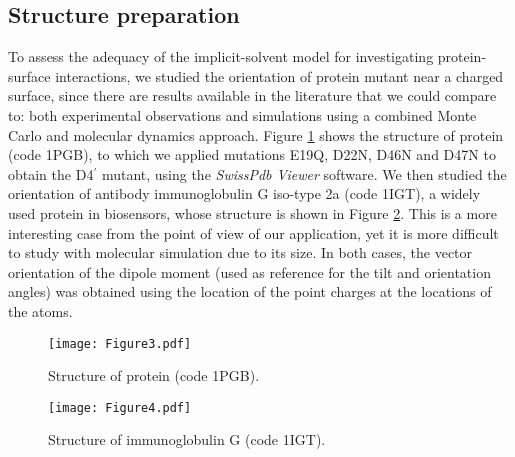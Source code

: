 \subsection{Structure preparation}

To assess the adequacy of the implicit-solvent model for investigating protein-surface interactions, we studied the orientation of protein \gb mutant near a charged surface, since there are results available in the literature that we could compare to: both experimental observations \cite{BaioWeidnerBaughGambleStaytonCastner2012} and simulations using a combined Monte Carlo and molecular dynamics approach.\cite{LiuLiaoZhou2013} Figure \ref{fig:1pgb} shows the structure of protein \gb (\pdb code {\small 1PGB}), to which we applied mutations {\small E19Q}, {\small D22N}, {\small D46N} and {\small D47N} to obtain the {\small D4$^\prime$} mutant, using the \textsl{SwissPdb Viewer} software.\cite{GuexPeitsch1997}
We then studied the orientation of antibody immunoglobulin G iso-type \ig 2a (\pdb code {\small 1IGT}), a widely used protein in biosensors, whose structure is shown in Figure \ref{fig:1igt}. This is a more interesting case from the point of view of our application, yet it is more difficult to study with molecular simulation due to its size.
In both cases, the vector orientation of the dipole moment (used as reference for the tilt and orientation angles) was obtained using the location of the point charges at the locations of the atoms.

\begin{figure}%
   \centering
   \texttt{[image: Figure3.pdf]}
   \caption{Structure of protein \gb (\pdb code {\small 1PGB}).}
   \label{fig:1pgb}
\end{figure}

\begin{figure}%
   \centering
   \texttt{[image: Figure4.pdf]}
   \caption{Structure of immunoglobulin G (\pdb code {\small 1IGT}).}
   \label{fig:1igt}
\end{figure}

